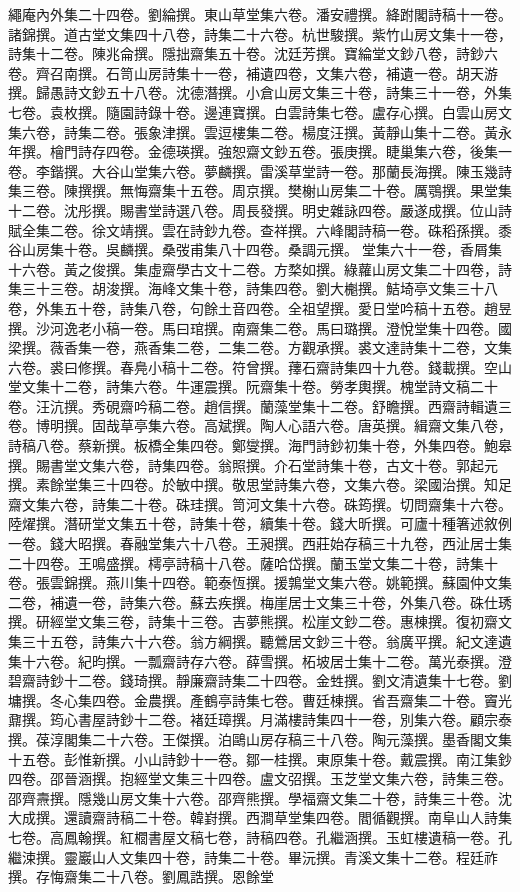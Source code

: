 \begin{pinyinscope}
繩庵內外集二十四卷。劉綸撰。東山草堂集六卷。潘安禮撰。絳跗閣詩稿十一卷。諸錦撰。道古堂文集四十八卷，詩集二十六卷。杭世駿撰。紫竹山房文集十一卷，詩集十二卷。陳兆侖撰。隱拙齋集五十卷。沈廷芳撰。寶綸堂文鈔八卷，詩鈔六卷。齊召南撰。石笥山房詩集十一卷，補遺四卷，文集六卷，補遺一卷。胡天游撰。歸愚詩文鈔五十八卷。沈德潛撰。小倉山房文集三十卷，詩集三十一卷，外集七卷。袁枚撰。隨園詩錄十卷。邊連寶撰。白雲詩集七卷。盧存心撰。白雲山房文集六卷，詩集二卷。張象津撰。雲逗樓集二卷。楊度汪撰。黃靜山集十二卷。黃永年撰。檜門詩存四卷。金德瑛撰。強恕齋文鈔五卷。張庚撰。睫巢集六卷，後集一卷。李鍇撰。大谷山堂集六卷。夢麟撰。雷溪草堂詩一卷。那蘭長海撰。陳玉幾詩集三卷。陳撰撰。無悔齋集十五卷。周京撰。樊榭山房集二十卷。厲鶚撰。果堂集十二卷。沈彤撰。賜書堂詩選八卷。周長發撰。明史雜詠四卷。嚴遂成撰。位山詩賦全集二卷。徐文靖撰。雲在詩鈔九卷。查祥撰。六峰閣詩稿一卷。硃稻孫撰。黍谷山房集十卷。吳麟撰。桑弢甫集八十四卷。桑調元撰。堂集六十一卷，香屑集十六卷。黃之俊撰。集虛齋學古文十二卷。方楘如撰。綠蘿山房文集二十四卷，詩集三十三卷。胡浚撰。海峰文集十卷，詩集四卷。劉大櫆撰。鮚埼亭文集三十八卷，外集五十卷，詩集八卷，句餘土音四卷。全祖望撰。愛日堂吟稿十五卷。趙昱撰。沙河逸老小稿一卷。馬曰琯撰。南齋集二卷。馬曰璐撰。澄悅堂集十四卷。國梁撰。薇香集一卷，燕香集二卷，二集二卷。方觀承撰。裘文達詩集十二卷，文集六卷。裘曰修撰。春鳧小稿十二卷。符曾撰。蘀石齋詩集四十九卷。錢載撰。空山堂文集十二卷，詩集六卷。牛運震撰。阮齋集十卷。勞孝輿撰。槐堂詩文稿二十卷。汪沆撰。秀硯齋吟稿二卷。趙信撰。蘭藻堂集十二卷。舒瞻撰。西齋詩輯遺三卷。博明撰。固哉草亭集六卷。高斌撰。陶人心語六卷。唐英撰。緝齋文集八卷，詩稿八卷。蔡新撰。板橋全集四卷。鄭燮撰。海門詩鈔初集十卷，外集四卷。鮑皋撰。賜書堂文集六卷，詩集四卷。翁照撰。介石堂詩集十卷，古文十卷。郭起元撰。素餘堂集三十四卷。於敏中撰。敬思堂詩集六卷，文集六卷。梁國治撰。知足齋文集六卷，詩集二十卷。硃珪撰。笥河文集十六卷。硃筠撰。切問齋集十六卷。陸燿撰。潛研堂文集五十卷，詩集十卷，續集十卷。錢大昕撰。可廬十種箸述敘例一卷。錢大昭撰。春融堂集六十八卷。王昶撰。西莊始存稿三十九卷，西沚居士集二十四卷。王鳴盛撰。樗亭詩稿十八卷。薩哈岱撰。蘭玉堂文集二十卷，詩集十卷。張雲錦撰。燕川集十四卷。範泰恆撰。援鶉堂文集六卷。姚範撰。蘇園仲文集二卷，補遺一卷，詩集六卷。蘇去疾撰。梅崖居士文集三十卷，外集八卷。硃仕琇撰。研經堂文集三卷，詩集十三卷。吉夢熊撰。松崖文鈔二卷。惠棟撰。復初齋文集三十五卷，詩集六十六卷。翁方綱撰。聽鶯居文鈔三十卷。翁廣平撰。紀文達遺集十六卷。紀昀撰。一瓢齋詩存六卷。薛雪撰。柘坡居士集十二卷。萬光泰撰。澄碧齋詩鈔十二卷。錢琦撰。靜廉齋詩集二十四卷。金甡撰。劉文清遺集十七卷。劉墉撰。冬心集四卷。金農撰。產鶴亭詩集七卷。曹廷棟撰。省吾齋集二十卷。竇光鼐撰。筠心書屋詩鈔十二卷。褚廷璋撰。月滿樓詩集四十一卷，別集六卷。顧宗泰撰。葆淳閣集二十六卷。王傑撰。泊鷗山房存稿三十八卷。陶元藻撰。墨香閣文集十五卷。彭惟新撰。小山詩鈔十一卷。鄒一桂撰。東原集十卷。戴震撰。南江集鈔四卷。邵晉涵撰。抱經堂文集三十四卷。盧文弨撰。玉芝堂文集六卷，詩集三卷。邵齊燾撰。隱幾山房文集十六卷。邵齊熊撰。學福齋文集二十卷，詩集三十卷。沈大成撰。還讀齋詩稿二十卷。韓崶撰。西澗草堂集四卷。閻循觀撰。南阜山人詩集七卷。高鳳翰撰。紅櫚書屋文稿七卷，詩稿四卷。孔繼涵撰。玉虹樓遺稿一卷。孔繼涑撰。靈巖山人文集四十卷，詩集二十卷。畢沅撰。青溪文集十二卷。程廷祚撰。存悔齋集二十八卷。劉鳳誥撰。恩餘堂
\end{pinyinscope}
